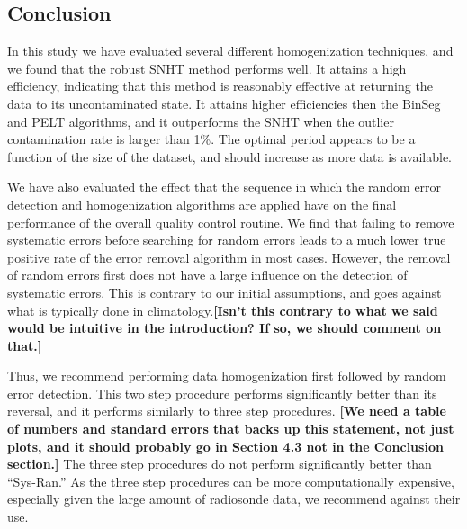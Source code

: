 \documentclass[12pt]{article}
\begin{document}
\begin{doublespacing}

\section{Conclusion}

In this study we have evaluated several different homogenization techniques, and we found that the robust SNHT method performs well.  It attains a high efficiency, indicating that this method is reasonably effective at returning the data to its uncontaminated state.  It attains higher efficiencies then the BinSeg and PELT algorithms, and it outperforms the SNHT when the outlier contamination rate is larger than 1\%.  The optimal period appears to be a function of the size of the dataset, and should increase as more data is available.

We have also evaluated the effect that the sequence in which the random error detection and homogenization algorithms are applied have on the final performance of the overall quality control routine.  We find that failing to remove systematic errors before searching for random errors leads to a much lower true positive rate of the error removal algorithm in most cases.  However,  the removal of random errors first does not have a large influence on the detection of systematic errors. This is contrary to our initial assumptions, and goes against what is typically done in climatology.\textbf{[Isn't this contrary to what we said would be intuitive in the introduction?  If so, we should comment on that.]}

Thus, we recommend performing data homogenization first followed by random error detection.  This two step procedure performs significantly better than its reversal, and it performs similarly to three step procedures. \textbf{[We need a table of numbers and standard errors that backs up this statement, not just plots, and it should probably go in Section 4.3 not in the Conclusion section.]}  The three step procedures do not perform significantly better than ``Sys-Ran.''  As the three step procedures can be more computationally expensive, especially given the large amount of radiosonde data, we recommend against their use.

\end{doublespacing}
\end{document}
